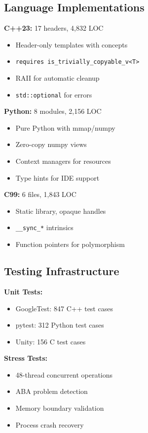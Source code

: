 \documentclass[sigconf,anonymous]{acmart}
\begin{document}
\subsection{Language Implementations}

\textbf{C++23:} 17 headers, 4,832 LOC
\begin{itemize}
\item Header-only templates with concepts
\item \texttt{requires is\_trivially\_copyable\_v<T>}
\item RAII for automatic cleanup
\item \texttt{std::optional} for errors
\end{itemize}

\textbf{Python:} 8 modules, 2,156 LOC
\begin{itemize}
\item Pure Python with mmap/numpy
\item Zero-copy numpy views
\item Context managers for resources
\item Type hints for IDE support
\end{itemize}

\textbf{C99:} 6 files, 1,843 LOC
\begin{itemize}
\item Static library, opaque handles
\item \texttt{\_\_sync\_*} intrinsics
\item Function pointers for polymorphism
\end{itemize}

\subsection{Testing Infrastructure}

\textbf{Unit Tests:}
\begin{itemize}
\item GoogleTest: 847 C++ test cases
\item pytest: 312 Python test cases
\item Unity: 156 C test cases
\end{itemize}

\textbf{Stress Tests:}
\begin{itemize}
\item 48-thread concurrent operations
\item ABA problem detection
\item Memory boundary validation
\item Process crash recovery
\end{itemize}
\end{document}
